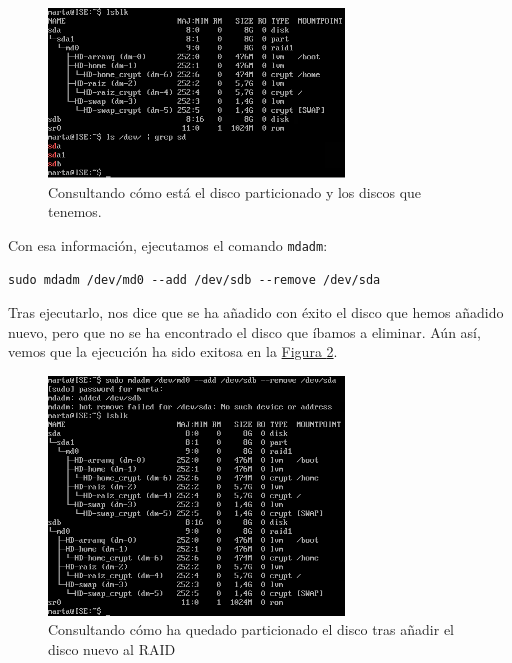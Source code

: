 \documentclass[10pt,a4paper,spanish]{article}
\numberwithin{equation}{section} %
\numberwithin{figure}{section} %
\numberwithin{table}{section} %
\begin{document}
\begin{enumerate}[1.]
    \begin{figure}[!h]
        \centering
        \includegraphics[width=0.7\textwidth]{3_5}
        \caption{Consultando cómo está el disco particionado y los discos que tenemos.}
        \label{lsblk}
    \end{figure}

    Con esa información, ejecutamos el comando \texttt{mdadm}:

\begin{verbatim}
sudo mdadm /dev/md0 --add /dev/sdb --remove /dev/sda    
\end{verbatim}

    Tras ejecutarlo, nos dice que se ha añadido con éxito el disco que hemos añadido nuevo, pero que no se ha encontrado el disco que íbamos a eliminar. Aún así, vemos que la ejecución ha sido exitosa en la \hyperref[finaloutput]{Figura \ref*{finaloutput}}.

    \begin{figure}[!h]
        \centering
        \includegraphics[width=0.7\textwidth]{3_6}
        \caption{Consultando cómo ha quedado particionado el disco tras añadir el disco nuevo al RAID}
        \label{finaloutput}
    \end{figure}
\end{enumerate}
\end{document}
